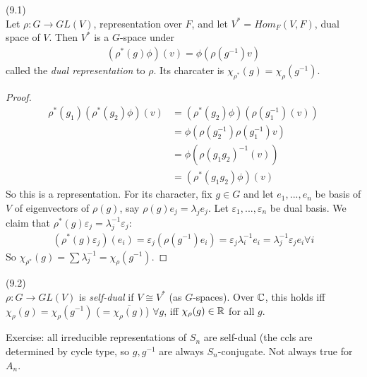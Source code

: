\documentclass[a4paper]{article}
\begin{document}
\begin{lemma} (9.1)\\
Let $\rho:G \to GL(V)$, representation over $F$, and let $V^* = Hom_F (V,F)$, dual space of $V$. Then $V^*$ is a $G$-space under 
\begin{equation*}
\begin{aligned}
(\rho^*(g)\phi)(v) = \phi(\rho(g^{-1})v)
\end{aligned}
\end{equation*}
called the \emph{dual representation} to $\rho$. Its charcater is $\chi_{\rho^*}(g) = \chi_\rho (g^{-1})$.
\begin{proof}
\begin{equation*}
\begin{aligned}
\rho^*(g_1) (\rho^*(g_2)\phi)(v) &= (\rho^*(g_2)\phi)(\rho(g_1^{-1})(v))\\
&= \phi(\rho(g_2^{-1}) \rho(g_1^{-1}) v)\\
&= \phi(\rho(g_1g_2)^{-1}(v))\\
&= (\rho^*(g_1g_2)\phi)(v)
\end{aligned}
\end{equation*}
So this is a representation. For its character, fix $g \in G$ and let $e_1,...,e_n$ be basis of $V$ of eigenvectors of $\rho(g)$, say $\rho(g) e_j = \lambda_j e_j$. Let $\varepsilon_1,...,\varepsilon_n$ be dual basis. We claim that $\rho^*(g) \varepsilon_j =\lambda^{-1}_j \varepsilon_j$:
\begin{equation*}
\begin{aligned}
(\rho^*(g)\varepsilon_j)(e_i) = \varepsilon_j(\rho(g^{-1})e_i) = \varepsilon_j\lambda_i^{-1}e_i = \lambda_j^{-1} \varepsilon_j e_i \forall i
\end{aligned}
\end{equation*}
So $\chi_{\rho^*}(g) = \sum \lambda_j^{-1}  = \chi_\rho(g^{-1})$.
\end{proof}
\end{lemma}

\begin{defi} (9.2)\\
$\rho:G \to GL(V)$ is \emph{self-dual} if $V \cong V^*$ (as $G$-spaces). Over $\mathbb{C}$, this holds iff $\chi_\rho(g) = \chi_\rho(g^{-1})$ ($=\overline{\chi_\rho(g)}$) $\forall g$, iff $\chi_\rho(g) \in \mathbb{R}$ for all $g$.
\end{defi}

Exercise: all irreducible representations of $S_n$ are self-dual (the ccls are determined by cycle type, so $g,g^{-1}$ are always $S_n$-conjugate. Not always true for $A_n$.
\end{document}
